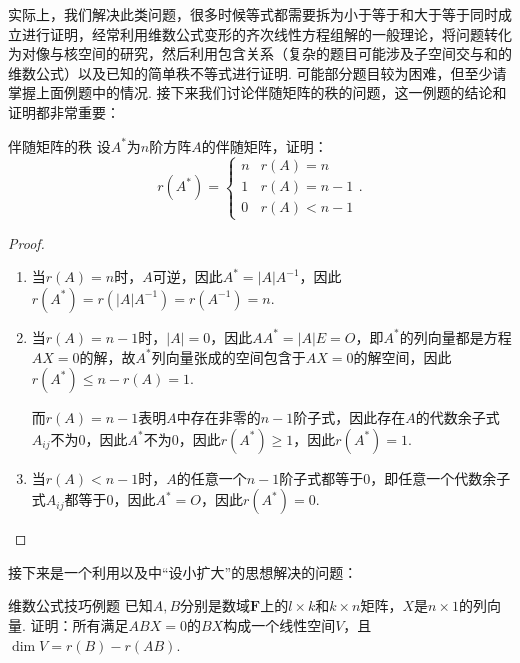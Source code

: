 实际上，我们解决此类问题，很多时候等式都需要拆为小于等于和大于等于同时成立进行证明，经常利用维数公式变形的齐次线性方程组解的一般理论，将问题转化为对像与核空间的研究，然后利用包含关系（复杂的题目可能涉及子空间交与和的维数公式）以及已知的简单秩不等式进行证明. 可能部分题目较为困难，但至少请掌握上面例题中的情况. 接下来我们讨论伴随矩阵的秩的问题，这一例题的结论和证明都非常重要：
\begin{example}{}{伴随矩阵的秩}
    设$A^*$为$n$阶方阵$A$的伴随矩阵，证明：
    \[r(A^*)=\begin{cases}
            n & r(A)=n \\ 1 & r(A)=n-1 \\ 0 & r(A) < n-1
        \end{cases}.\]
\end{example}

\begin{proof}
    \begin{enumerate}
        \item 当$r(A)=n$时，$A$可逆，因此$A^*=|A|A^{-1}$，因此$r(A^*)=r(|A|A^{-1})=r(A^{-1})=n$.

        \item 当$r(A)=n-1$时，$|A|=0$，因此$AA^*=|A|E=O$，即$A^*$的列向量都是方程$AX=0$的解，故$A^*$列向量张成的空间包含于$AX=0$的解空间，因此$r(A^*)\leqslant n-r(A)=1$.

              而$r(A)=n-1$表明$A$中存在非零的$n-1$阶子式，因此存在$A$的代数余子式$A_{ij}$不为0，因此$A^*$不为0，因此$r(A^*)\geqslant 1$，因此$r(A^*)=1$.

        \item 当$r(A)<n-1$时，$A$的任意一个$n-1$阶子式都等于0，即任意一个代数余子式$A_{ij}$都等于0，因此$A^*=O$，因此$r(A^*)=0$.
    \end{enumerate}
\end{proof}

接下来是一个利用以及中``设小扩大''的思想解决的问题：
\begin{example}{}{维数公式技巧例题}
    已知$A,B$分别是数域$\mathbf{F}$上的$l \times k$和$k \times n$矩阵，$X$是$n \times 1$的列向量. 证明：所有满足$ABX=0$的$BX$构成一个线性空间$V$，且$\dim V = r(B) - r(AB)$.
\end{example}

